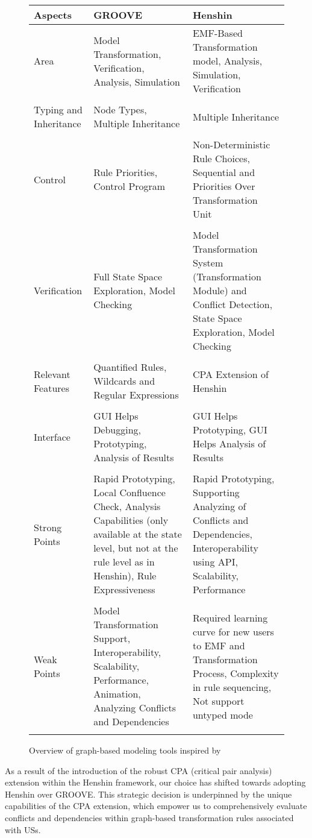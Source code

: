 \begin{figure}
\begingroup
\footnotesize
\centering
\begin{tabularx}{\textwidth}{l  X  X}
\hline
Aspects&	GROOVE	&Henshin\\
\hline\hline
Area	&Model Transformation, Veriﬁcation, Analysis, Simulation	&EMF-Based Transformation model, Analysis, Simulation, Verification \\ \\ 
Typing and Inheritance&	Node Types, Multiple Inheritance	&Multiple Inheritance\\\\ 
Control&	Rule Priorities, Control Program	&Non-Deterministic Rule Choices, Sequential and Priorities Over Transformation Unit \\\\ 
Verification&	 Full State Space Exploration, Model Checking	&Model Transformation System (Transformation Module) and Conflict Detection, State Space Exploration, Model Checking\\\\ 
Relevant Features&	Quantiﬁed Rules, Wildcards and Regular Expressions	&CPA Extension of Henshin\\\\ 
Interface&	GUI Helps Debugging, Prototyping, Analysis of Results	&GUI Helps Prototyping, GUI Helps Analysis of Results\\\\ 
Strong Points&	Rapid Prototyping, Local Conﬂuence Check, Analysis Capabilities (only available at the state level, but not at the rule level as in Henshin), Rule Expressiveness	&Rapid Prototyping, Supporting Analyzing of Conflicts and Dependencies, Interoperability using API, Scalability, Performance\\\\ 
Weak Points&	Model Transformation Support, Interoperability, Scalability, Performance, Animation, Analyzing Conflicts and Dependencies 	&Required learning curve for new users to EMF and Transformation Process, Complexity in rule sequencing, Not support untyped mode\\\\ 
\hline

\end{tabularx}
\begin{TableCaption}
\caption{Overview of graph-based modeling tools inspired by \cite{ghamarian2012modelling}}\label{tb:sec_6_comparative_analysis_final}
\end{TableCaption}
\endgroup
\end{figure}
As a result of the introduction of the robust CPA (critical pair analysis) extension within the Henshin framework, our choice has shifted towards adopting Henshin over GROOVE. This strategic decision is underpinned by the unique capabilities of the CPA extension, which empower us to comprehensively evaluate conflicts and dependencies within graph-based transformation rules associated with USs. 

